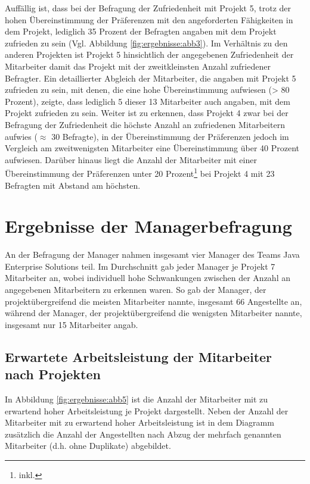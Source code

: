 Auffällig ist, dass bei der Befragung der Zufriedenheit mit Projekt 5, trotz der hohen Übereinstimmung der Präferenzen mit den angeforderten Fähigkeiten in dem Projekt, lediglich 35 Prozent der Befragten angaben mit dem Projekt zufrieden zu sein (Vgl. Abbildung \ref{fig:ergebnisse:abb3}).
Im Verhältnis zu den anderen Projekten ist Projekt 5 hinsichtlich der angegebenen Zufriedenheit der Mitarbeiter damit das Projekt mit der zweitkleinsten Anzahl zufriedener Befragter.
Ein detaillierter Abgleich der Mitarbeiter, die angaben mit Projekt 5 zufrieden zu sein, mit denen, die eine hohe Übereinstimmung aufwiesen (> 80 Prozent), zeigte, dass lediglich 5 dieser 13 Mitarbeiter auch angaben, mit dem Projekt zufrieden zu sein.
Weiter ist zu erkennen, dass Projekt 4 zwar bei der Befragung der Zufriedenheit die höchste Anzahl an zufriedenen Mitarbeitern aufwies ($\approx$ 30 Befragte), in der Übereinstimmung der Präferenzen jedoch im Vergleich am zweitwenigsten Mitarbeiter eine Übereinstimmung über 40 Prozent aufwiesen.
Darüber hinaus liegt die Anzahl der Mitarbeiter mit einer Übereinstimmung der Präferenzen unter 20 Prozent\footnote{inkl.} bei Projekt 4 mit 23 Befragten mit Abstand am höchsten.

\section{Ergebnisse der Managerbefragung}
An der Befragung der Manager nahmen insgesamt vier Manager des Teams Java Enterprise Solutions teil.
Im Durchschnitt gab jeder Manager je Projekt 7 Mitarbeiter an, wobei individuell hohe Schwankungen zwischen der Anzahl an angegebenen Mitarbeitern zu erkennen waren.
So gab der Manager, der projektübergreifend die meisten Mitarbeiter nannte, insgesamt 66 Angestellte an, während der Manager, der projektübergreifend die wenigsten Mitarbeiter nannte, insgesamt nur 15 Mitarbeiter angab.

\subsection{Erwartete Arbeitsleistung der Mitarbeiter nach Projekten}
In Abbildung \ref{fig:ergebnisse:abb5} ist die Anzahl der Mitarbeiter mit zu erwartend hoher Arbeitsleistung je Projekt dargestellt.
Neben der Anzahl der Mitarbeiter mit zu erwartend hoher Arbeitsleistung ist in dem Diagramm zusätzlich die Anzahl der Angestellten nach Abzug der mehrfach genannten Mitarbeiter (d.h. ohne Duplikate) abgebildet.


